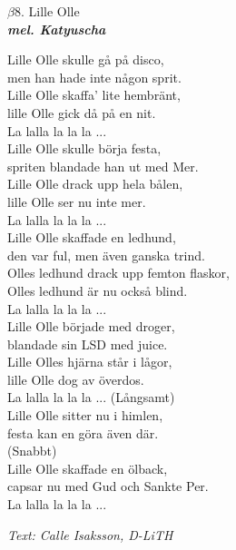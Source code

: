 \documentclass[a6paper,10pt]{article}
\newcommand{\mel}[1]{\small\textbf{\textit{mel. #1 \\}}}
\begin{document}
\setlength{\oddsidemargin}{-0.47in}
\begin{center}
\Large $\beta8$. Lille Olle \\ 
\mel{Katyuscha}
\end{center}
Lille Olle skulle gå på disco, \\
men han hade inte någon sprit.\\ 
Lille Olle skaffa' lite hembränt, \\
lille Olle gick då på en nit. \\
\newline
La lalla la la la ... \\
\newline
Lille Olle skulle börja festa, \\
spriten blandade han ut med Mer. \\
Lille Olle drack upp hela bålen, \\
lille Olle ser nu inte mer. \\
\newline
La lalla la la la ... \\
\newline
Lille Olle skaffade en ledhund,\\ 
den var ful, men även ganska trind. \\
Olles ledhund drack upp femton flaskor,\\ 
Olles ledhund är nu också blind. \\
\newline
La lalla la la la ... \\
\newline 
Lille Olle började med droger, \\
blandade sin LSD med juice. \\
Lille Olles hjärna står i lågor, \\
lille Olle dog av överdos. \\
\newline
La lalla la la la ... 
\setlength{\oddsidemargin}{-0.37in}
\noindent
(Långsamt) \\
Lille Olle sitter nu i himlen, \\
festa kan en göra även där.\\ 
(Snabbt) \\
Lille Olle skaffade en ölback, \\
capsar nu med Gud och Sankte Per. \\
\newline
La lalla la la la ...
\begin{flushright}
\textit{Text: Calle Isaksson, D-LiTH}
\end{flushright}
\end{document}
